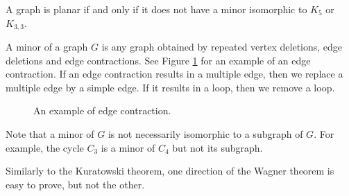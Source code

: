 \begin{page}

\begin{thm}[Wagner]
A graph is planar if and only if it does not have a minor isomorphic to $K_5$ or $K_{3,3}$.
\end{thm}

\end{page}

\begin{page}


A minor of a graph $G$ is any graph obtained by repeated vertex deletions, edge deletions and edge contractions.
See Figure \ref{fig:K5Contraction} for an example of an edge contraction.
If an edge contraction results in a multiple edge, then we replace a multiple edge by a simple edge.
If it results in a loop, then we remove a loop.

\begin{figure}[ht]
\begin{center}

\end{center}
\caption{An example of edge contraction.}
\label{fig:K5Contraction}
\end{figure}

Note that a minor of $G$ is not necessarily isomorphic to a subgraph of $G$.
For example, the cycle $C_3$ is a minor of $C_4$ but not its subgraph.

Similarly to the Kuratowski theorem, one direction of the Wagner theorem is easy to prove, but not the other.




\end{page}

